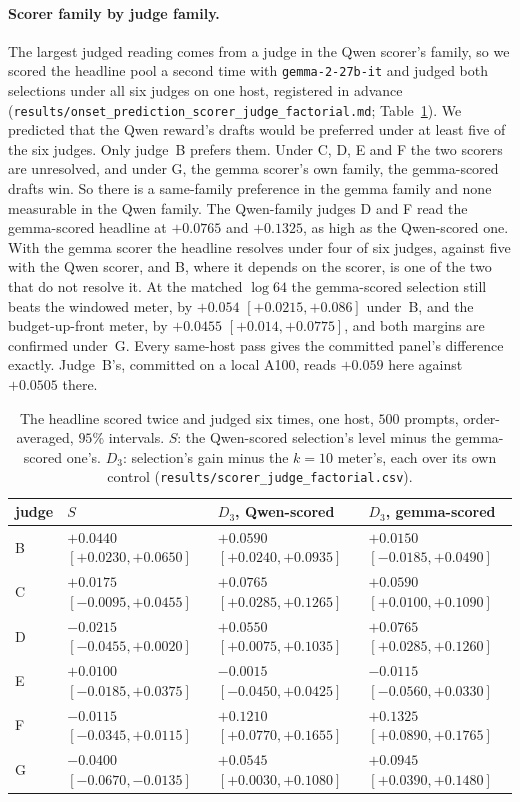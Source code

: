 \paragraph{Scorer family by judge family.}\label{app:factorial}
The largest judged reading comes from a judge in the Qwen scorer's family, so we scored the headline pool a
second time with \texttt{gemma-2-27b-it} and judged both selections under all six judges on one host,
registered in advance (\texttt{results/\allowbreak onset\_\allowbreak prediction\_\allowbreak scorer\_\allowbreak judge\_\allowbreak factorial.md}; Table~\ref{tab:factorial}). We predicted that the Qwen reward's
drafts would be preferred under at least five of the six judges. Only judge~B prefers them. Under C, D, E
and F the two scorers are unresolved, and under G, the gemma scorer's own family, the gemma-scored drafts
win. So there is a same-family preference in the gemma family and none measurable in the Qwen family. The
Qwen-family judges D and F read the gemma-scored headline at $+0.0765$ and $+0.1325$, as high as the
Qwen-scored one. With the gemma scorer the headline resolves under four of six judges, against five with
the Qwen scorer, and B, where it depends on the scorer, is one of the two that do not resolve it. At the
matched $\log 64$ the gemma-scored selection still beats the windowed meter, by $+0.054$
$[+0.0215, +0.086]$ under~B, and the budget-up-front meter, by $+0.0455$ $[+0.014, +0.0775]$, and both
margins are confirmed under~G. Every same-host pass gives the committed panel's difference exactly.
Judge~B's, committed on a local A100, reads $+0.059$ here against $+0.0505$ there.

\begin{table}[ht]
\centering\footnotesize
\caption{The headline scored twice and judged six times, one host, $500$ prompts, order-averaged, $95\%$
intervals. $S$: the Qwen-scored selection's level minus the gemma-scored one's. $D_3$: selection's gain
minus the $k=10$ meter's, each over its own control (\texttt{results/\allowbreak scorer\_\allowbreak judge\_\allowbreak factorial.csv}).}\label{tab:factorial}
\setlength{\tabcolsep}{3pt}
\begin{tabular}{@{}llll@{}}
\toprule
judge & $S$ & $D_3$, Qwen-scored & $D_3$, gemma-scored \\
\midrule
B & $+0.0440$ $[+0.0230, +0.0650]$ & $+0.0590$ $[+0.0240, +0.0935]$ & $+0.0150$ $[-0.0185, +0.0490]$ \\
C & $+0.0175$ $[-0.0095, +0.0455]$ & $+0.0765$ $[+0.0285, +0.1265]$ & $+0.0590$ $[+0.0100, +0.1090]$ \\
D & $-0.0215$ $[-0.0455, +0.0020]$ & $+0.0550$ $[+0.0075, +0.1035]$ & $+0.0765$ $[+0.0285, +0.1260]$ \\
E & $+0.0100$ $[-0.0185, +0.0375]$ & $-0.0015$ $[-0.0450, +0.0425]$ & $-0.0115$ $[-0.0560, +0.0330]$ \\
F & $-0.0115$ $[-0.0345, +0.0115]$ & $+0.1210$ $[+0.0770, +0.1655]$ & $+0.1325$ $[+0.0890, +0.1765]$ \\
G & $-0.0400$ $[-0.0670, -0.0135]$ & $+0.0545$ $[+0.0030, +0.1080]$ & $+0.0945$ $[+0.0390, +0.1480]$ \\
\bottomrule
\end{tabular}
\end{table}

